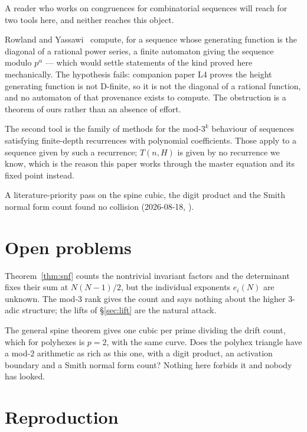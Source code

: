 \documentclass[11pt]{article}
\begin{document}
A reader who works on congruences for combinatorial sequences will reach for two
tools here, and neither reaches this object.

Rowland and Yassawi~\cite{rowlandYassawi2015} compute, for a sequence whose
generating function is the diagonal of a rational power series, a finite
automaton giving the sequence modulo $p^\alpha$ --- which would settle statements
of the kind proved here mechanically. The hypothesis fails: companion paper L4
proves the height generating function is not D-finite, so it is not the diagonal
of a rational function, and no automaton of that provenance exists to compute.
The obstruction is a theorem of ours rather than an absence of effort.

The second tool is the family of methods for the mod-$3^k$ behaviour of
sequences satisfying finite-depth recurrences with polynomial coefficients.
Those apply to a sequence given by such a recurrence; $T(n,H)$ is given by no
recurrence we know, which is the reason this paper works through the master
equation and its fixed point instead.

A literature-priority pass on the spine cubic, the digit product and the Smith
normal form count found no collision (2026-08-18,
).

\section{Open problems}

\begin{openproblem}
Theorem~\ref{thm:snf} counts the nontrivial invariant factors and the
determinant fixes their sum at $N(N-1)/2$, but the individual exponents
$e_i(N)$ are unknown. The mod-$3$ rank gives the count and says nothing about
the higher $3$-adic structure; the lifts of \S\ref{sec:lift} are the natural
attack.
\end{openproblem}

\begin{openproblem}
The general spine theorem gives one cubic per prime dividing the drift count,
which for polyhexes is $p = 2$, with the same curve. Does the polyhex triangle
have a mod-$2$ arithmetic as rich as this one, with a digit product, an
activation boundary and a Smith normal form count? Nothing here forbids it and
nobody
has looked.
\end{openproblem}

\section{Reproduction}
\label{sec:repro}
\end{document}
